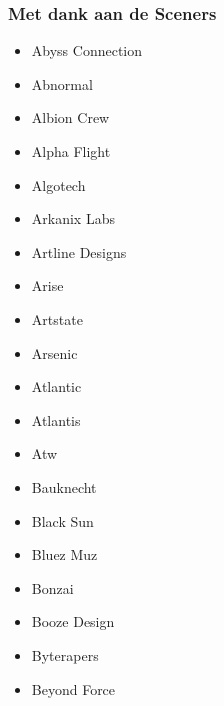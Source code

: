 \begin{frame}
\frametitle{Met dank aan de Sceners}

\begin{multicols}{3}
\begin{itemize}
\item Abyss Connection
\item Abnormal
\item Albion Crew
\item Alpha Flight
\item Algotech
\item Arkanix Labs
\item Artline Designs
\item Arise
\item Artstate
\item Arsenic
\item Atlantic
\item Atlantis
\item Atw
\item Bauknecht
\item Black Sun
\item Bluez Muz
\item Bonzai
\item Booze Design
\item Byterapers
\item Beyond Force
\end{itemize}
\end{multicols}

\end{frame}


